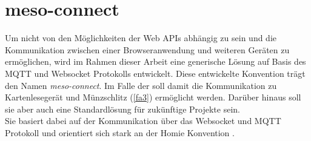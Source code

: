 \section{meso-connect}
\label{sec:meso-connect}

Um nicht von den Möglichkeiten der Web APIs abhängig zu sein und die Kommunikation
zwischen einer Browseranwendung und weiteren Geräten zu ermöglichen, wird im Rahmen dieser
Arbeit eine generische Lösung auf Basis des MQTT und Websocket Protokolls entwickelt.
Diese entwickelte Konvention trägt den Namen \emph{meso-connect}.
Im Falle der \shst{} soll damit die Kommunikation zu Kartenlesegerät und Münzschlitz (\ref{fa3})
ermöglicht werden. Darüber hinaus soll sie aber auch eine Standardlösung für zukünftige 
Projekte sein. \\
Sie basiert dabei auf der Kommunikation über das Websocket und MQTT Protokoll und orientiert sich stark an 
der Homie Konvention \cite{homie}.



